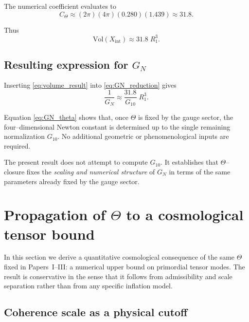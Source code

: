 \documentclass[11pt]{article}
\begin{document}
The numerical coefficient evaluates to
\begin{equation}
C_{\Theta}
\approx
(2\pi)(4\pi)(0.280)(1.439)
\approx
31.8.
\end{equation}

Thus
\begin{equation}
\boxed{
\mathrm{Vol}(X_{\mathrm{int}})
\approx
31.8\; R_1^3.
}
\label{eq:volume_result}
\end{equation}

\subsection{Resulting expression for $G_N$}

Inserting \eqref{eq:volume_result} into \eqref{eq:GN_reduction} gives
\begin{equation}
\boxed{
\frac{1}{G_N}
\approx
\frac{31.8}{G_{10}}\; R_1^3.
}
\label{eq:GN_theta}
\end{equation}

Equation \eqref{eq:GN_theta} shows that, once $\Theta$ is fixed by the gauge
sector, the four--dimensional Newton constant is determined up to the single
remaining normalization $G_{10}$.
No additional geometric or phenomenological inputs are required.

\begin{remark}
The present result does not attempt to compute $G_{10}$.
It establishes that $\Theta$--closure fixes the \emph{scaling and numerical
structure} of $G_N$ in terms of the same parameters already fixed by the gauge
sector.
\end{remark}


\section{Propagation of $\Theta$ to a cosmological tensor bound}

In this section we derive a quantitative cosmological consequence of the same
$\Theta$ fixed in Papers~I--III: a numerical upper bound on primordial tensor
modes. The result is conservative in the sense that it follows from
admissibility and scale separation rather than from any specific inflation model.

\subsection{Coherence scale as a physical cutoff}
\end{document}
